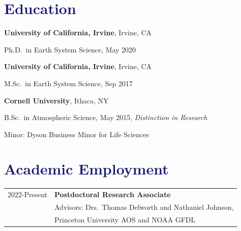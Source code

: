 \documentclass[margin,line,palatino,courier,10pt]{res}
\newenvironment{list1}{
  \begin{list}{\ding{113}}{%
      \setlength{\itemsep}{0in}
      \setlength{\parsep}{0in} \setlength{\parskip}{0in}
      \setlength{\topsep}{0in} \setlength{\partopsep}{0in}
      \setlength{\leftmargin}{0.17in}}}{\end{list}}
\begin{document}
\begin{resume}
\section{\sc \large{\textcolor{MidnightBlue}{\textbf{Education}}}}

{\bf University of California, Irvine}, Irvine, CA\\
\vspace*{-.12in}
\begin{list1}
\item[] Ph.D.~in Earth System Science, May 2020
\end{list1}

{\bf University of California, Irvine}, Irvine, CA\\
\vspace*{-.12in}
\begin{list1}
\item[] M.Sc.~in Earth System Science, Sep 2017
\end{list1}

{\bf Cornell University}, Ithaca, NY\\
\vspace*{-.12in}
\begin{list1}
\item[] B.Sc.~in Atmospheric Science, May 2015, \textit{Distinction in Research}

\hspace*{0.2in}  Minor: Dyson Business Minor for Life Sciences

\end{list1}

\section{\sc \textcolor{MidnightBlue}{\large{\textbf{Academic Employment}}}}
\vspace*{0.05in}
\begin{tabular}{@{}p{0.9in}p{4in}}
2022-Present & \textbf{Postdoctoral Research Associate}\\
& \hspace{0.2in} Advisors: Drs.\ Thomas Delworth and Nathaniel Johnson,\\
& \vspace{-0.18in}\hspace{0.2in} Princeton University AOS and NOAA GFDL\\


\end{tabular}
\end{resume}
\end{document}
